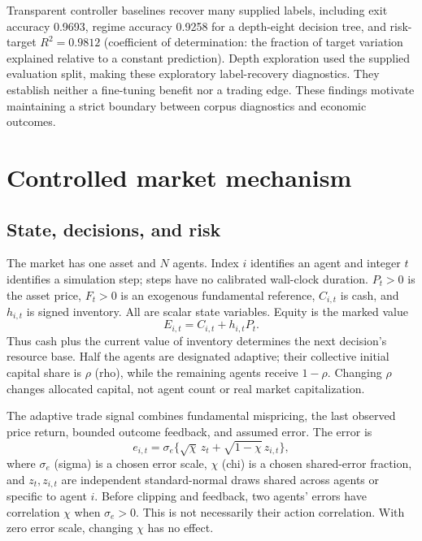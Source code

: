 Transparent controller baselines recover many supplied labels, including exit accuracy 0.9693, regime accuracy 0.9258 for a depth-eight decision tree, and risk-target $R^2=0.9812$ (coefficient of determination: the fraction of target variation explained relative to a constant prediction). Depth exploration used the supplied evaluation split, making these exploratory label-recovery diagnostics. They establish neither a fine-tuning benefit nor a trading edge. These findings motivate maintaining a strict boundary between corpus diagnostics and economic outcomes.

\section{Controlled market mechanism}
\subsection{State, decisions, and risk}
The market has one asset and $N$ agents. Index $i$ identifies an agent and integer $t$ identifies a simulation step; steps have no calibrated wall-clock duration. $P_t>0$ is the asset price, $F_t>0$ is an exogenous fundamental reference, $C_{i,t}$ is cash, and $h_{i,t}$ is signed inventory. All are scalar state variables. Equity is the marked value
\begin{equation}
 E_{i,t}=C_{i,t}+h_{i,t}P_t.
\end{equation}
Thus cash plus the current value of inventory determines the next decision's resource base. Half the agents are designated adaptive; their collective initial capital share is $\rho$ (rho), while the remaining agents receive $1-\rho$. Changing $\rho$ changes allocated capital, not agent count or real market capitalization.

The adaptive trade signal combines fundamental mispricing, the last observed price return, bounded outcome feedback, and assumed error. The error is
\begin{equation}
 e_{i,t}=\sigma_e\{\sqrt{\chi}\,z_t+\sqrt{1-\chi}\,z_{i,t}\},
\end{equation}
where $\sigma_e$ (sigma) is a chosen error scale, $\chi$ (chi) is a chosen shared-error fraction, and $z_t,z_{i,t}$ are independent standard-normal draws shared across agents or specific to agent $i$. Before clipping and feedback, two agents' errors have correlation $\chi$ when $\sigma_e>0$. This is not necessarily their action correlation. With zero error scale, changing $\chi$ has no effect.


